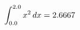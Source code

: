 \documentclass[preview]{standalone}
\begin{document}
\begin{align*}
\special{dvisvgm:raw <g id='unique000'>}\int_{0.0}^{2.0} x^{2} \, dx = 2.6667\special{dvisvgm:raw </g>}
\end{align*}
\end{document}

